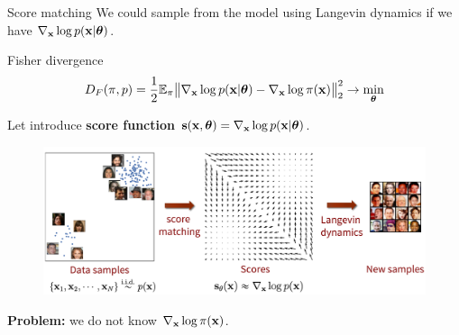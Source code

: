\begin{frame}{Score matching}
	We could sample from the model using Langevin dynamics if we have $\nabla_{\mathbf{x}}\log p(\mathbf{x}| \boldsymbol{\theta})$.
	\begin{block}{Fisher divergence}
		\vspace{-0.3cm}
		\[
		D_F(\pi, p) = \frac{1}{2}\mathbb{E}_{\pi}\bigl\| \nabla_{\mathbf{x}}\log p(\mathbf{x}| \boldsymbol{\theta}) - \nabla_{\mathbf{x}} \log \pi(\mathbf{x}) \bigr\|^2_2 \rightarrow \min_{\boldsymbol{\theta}}
		\]
		\vspace{-0.5cm}
	\end{block}
	Let introduce \textbf{score function} $\mathbf{s}(\mathbf{x}, \boldsymbol{\theta}) = \nabla_{\mathbf{x}}\log p(\mathbf{x}| \boldsymbol{\theta})$. 
	\vspace{-0.2cm}
	\begin{figure}
		\centering
		\includegraphics[width=0.75\linewidth]{figs/smld}
	\end{figure}
	\vspace{-0.3cm} 
	\textbf{Problem:} we do not know $\nabla_{\mathbf{x}} \log \pi(\mathbf{x})$.
\end{frame}
